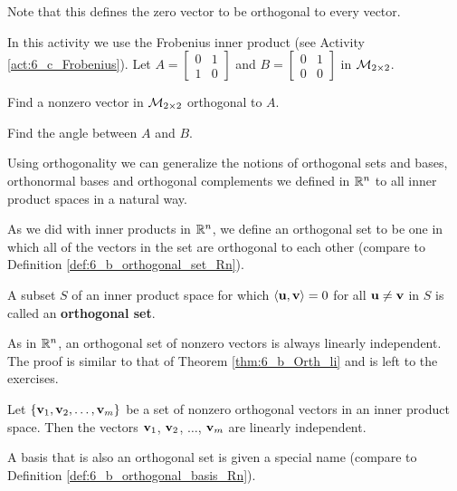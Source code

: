 Note that this defines the zero vector to be orthogonal to every vector.

\begin{activity} In this activity we use the Frobenius inner product (see Activity \ref{act:6_c_Frobenius}). Let $A = \left[ \begin{array}{cc} 0&1\\1&0 \end{array} \right]$ and $B = \left[ \begin{array}{cc} 0&1\\0&0 \end{array} \right]$ in $\mathcal{M}_{2 \times 2}$.
	\ba
	\item Find a nonzero vector in $\mathcal{M}_{2 \times 2}$ orthogonal to $A$.
	
	
	\item Find the angle between $A$ and $B$. 

	\ea
\end{activity}

Using orthogonality we can generalize the notions of orthogonal sets and bases, orthonormal bases and orthogonal complements we defined in $\mathbb{R}^n$ to all inner product spaces in a natural way.

\label{sec:inner_prog_orthog_bases}

As we did with inner products in $\mathbb{R}^n$, we define an orthogonal set to be one in which all of the vectors in the set are orthogonal to each other  (compare to Definition \ref{def:6_b_orthogonal_set_Rn}).

\begin{definition} A subset $S$ of an inner product space for which $\langle \mathbf{u}, \mathbf{v} \rangle = 0$ for all $\mathbf{u} \neq \mathbf{v}$ in $S$ is called an \textbf{orthogonal set}. 
\end{definition}

As in $\mathbb{R}^n$, an orthogonal set of nonzero vectors is always linearly independent. The proof is similar to that of Theorem  \ref{thm:6_b_Orth_li} and is left to the exercises. 

\begin{theorem} \label{thm:6_c_Orth_li_ips} Let $\{\mathbf{v}_1, \mathbf{v}_2, \ldots, \mathbf{v}_m\}$ be a set of nonzero orthogonal vectors in an inner product space. Then the vectors $\mathbf{v}_1$, $\mathbf{v}_2$, $\ldots$, $\mathbf{v}_m$ are linearly independent.
\end{theorem}


A basis that is also an orthogonal set is given a special name (compare to Definition \ref{def:6_b_orthogonal_basis_Rn}).

